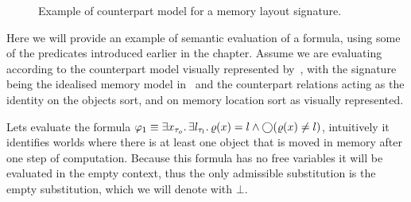 \begin{figure}
  \begin{center}
  \end{center}
  \caption{Example of counterpart model for a memory layout signature.}
  \label{fig:exmemsignature}
\end{figure}

Here we will provide an example of semantic evaluation of a formula, using some of the predicates introduced earlier in the chapter.  Assume we are evaluating according to the counterpart model visually represented by~, with the signature being the idealised memory model in~ and the counterpart relations acting as the identity on the objects sort, and on memory location sort as visually represented. 

Lets evaluate the formula $\varphi_1 \equiv \exists {x_{\tau_o}} \ldotp {\exists {l_{\tau_l}} \ldotp {\varrho(x) = l \land \bigcirc{(\varrho(x) \neq l)}}}$, intuitively it identifies worlds where there is at least one object that is moved in memory after one step of computation.
Because this formula has no free variables it will be evaluated in the empty context, thus the only admissible substitution is the empty substitution, which we will denote with $\bot$.

